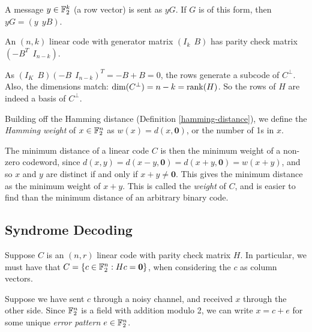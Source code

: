 \documentclass{article}
\begin{document}
\begin{note}
	A message $y \in \mathbb{F}_2^k$ (a row vector) is sent as $yG$.
	If $G$ is of this form, then $yG = (y \ \ yB)$.
\end{note}

\begin{proposition}
    An $(n, k)$ linear code with generator matrix $(I_k \ \ B)$ has parity check matrix $(-B^T \ \ I_{n-k})$.
\end{proposition}

\begin{prf}
    As $(I_K \ \ B) (-B \ \ I_{n-k})^T = -B + B = 0$, the rows generate a subcode of $C^\bot$. Also, the dimensions match: $\dim(C^\bot) = n - k = \operatorname{rank}(H)$. So the rows of $H$ are indeed a basis of $C^\bot$.
\end{prf}

\begin{definition}
	\label{hamming-weight}
    Building off the Hamming distance (Definition \ref{hamming-distance}), we define the \textit{Hamming weight} of $x \in \mathbb{F}_2^n$ as $w(x) = d(x, \mathbf{0})$, or the number of 1s in $x$.
\end{definition}

\begin{corollary}
    The minimum distance of a linear code $C$ is then the minimum weight of a non-zero codeword, since $d(x, y) = d(x-y, \mathbf{0}) = d(x + y, \mathbf{0}) = w(x+y)$, and so $x$ and $y$ are distinct if and only if $x + y \neq \mathbf{0}$. This gives the minimum distance as the minimum weight of $x + y$. This is called the \textit{weight} of $C$, and is easier to find than the minimum distance of an arbitrary binary code.
\end{corollary}

\subsection{Syndrome Decoding}

Suppose $C$ is an $(n, r)$ linear code with parity check matrix $H$.
In particular, we must have that $C = \left\lbrace c \in \mathbb{F}_2^n : Hc = \mathbf{0} \right\rbrace$, when considering the $c$ as column vectors.

Suppose we have sent $c$ through a noisy channel, and received $x$ through the other side.
Since $\mathbb{F}_2^n$ is a field with addition modulo 2, we can write $x = c + e$ for some unique \textit{error pattern} $e \in \mathbb{F}_2^n$.
\end{document}
